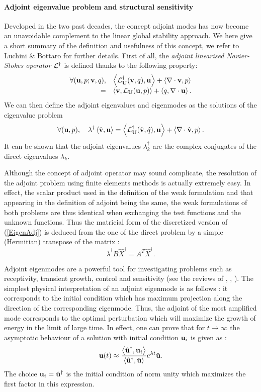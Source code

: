 \documentclass[twocolumn,10pt]{asme2ej}
\newcommand{\be}[1]{ \begin{equation} \label{#1}}
\newcommand{\ee}{\end{equation}}
\newcommand{\bes}[1]{ \begin{equation} \label{#1}\begin{array}{rl}}
\newcommand{\ees}{\end{array}\end{equation}}
\begin{document}
\paragraph{Adjoint eigenvalue problem and structural sensitivity}
Developed in the two past decades, the concept adjoint modes has now become an unavoidable complement to the linear global stability approach. We here give a short summary of the definition and usefulness of this concept, 
we refer to Luchini \& Bottaro\cite{LucBott2014} for further details.
First of all, the {\em adjoint linearised Navier-Stokes operator} ${\cal L}^\dag$ is defined thanks to the following 
property:
\bes{NSLAdj}
\forall ( {\bf u}, p ; {\bf v}, q), & \left< {\cal L}^\dag_{\bf U}( {\bf v},q) ,{\bf u}\right> + \left< \nabla \cdot {\bf v},p\right>  \\
=& \left< {\bf v}, {\cal L}_{\bf U} ({\bf u},p)\right> + \left< q, \nabla \cdot {\bf u}\right>.
\ees
We can then define the adjoint eigenvalues and eigenmodes as the solutions of the eigenvalue problem 
\be{EigenAdj} 
\forall ( {\bf u}, p), \quad  \lambda^\dag \left< \hat{\bf v}, {\bf u}\right> =
 \left< {\cal L}^\dag_{\bf U}( \hat{\bf v},\hat{q}) ,{\bf u}\right> + \left< \nabla \cdot \hat{\bf v},p\right> . 
\ee
It can be shown \cite{SchmidHenningson2001} that the adjoint eigenvalues $\lambda^\dag_k$ are the complex conjugates of the direct eigenvalues $\lambda_k$. 

Although the concept of adjoint operator may sound complicate, the resolution of the adjoint problem using finite elements methods is actually extremely easy. In effect, the scalar product used in the definition of the weak formulation and that appearing in the definition of adjoint being the same, the weak formulations of both problems are thus identical when exchanging the test functions and the unknown functions. Thus the matricial form of the discretized version of (\ref{EigenAdj}) is deduced from the one of the direct problem by a simple (Hermitian) transpose of the matrix :
\be{Eigen_Adj_matricial}
\overline{\lambda}^\dag B \hat{X}^\dag = A^T \hat{X}^\dag.
\ee

Adjoint eigenmodes are a powerful tool for investigating problems such as receptivity, transient growth, control and sensitivity (see the reviews of \cite{Jmc2005}, \cite{Ps2007}, \cite{LucBott2014}). The simplest physical interpretation of an adjoint eigenmode is as follows : it corresponds to the initial condition which has maximum projection along the direction of the corresponding eigenmode.
Thus, the adjoint of the most amplified mode corresponds to the optimal perturbation which will maximize the growth of energy in the limit of large time. In effect, one can prove that for $t \rightarrow \infty$  the asymptotic behaviour of a solution with initial condition ${\bf u}_i$  is given as :
$$
{\bf u}(t) \approx 
\frac{ \left< \hat{\bf u}^\dag, {\bf u}_i\right>}{\left<\hat{\bf u}^\dag, \hat{\bf u}\right>} 
e^{\lambda t} \hat{\bf u}.
$$
The choice ${\bf u}_i = \hat{\bf u}^\dag$ is the initial condition of norm unity which maximizes the first factor in this expression.
\end{document}
